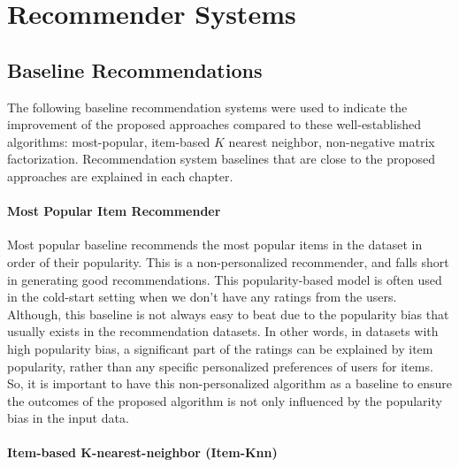     
\section{Recommender Systems}  


    \subsection{Baseline Recommendations}
    
        The following baseline recommendation systems were used to indicate the improvement of the proposed approaches compared to these well-established algorithms: most-popular, item-based $K$ nearest neighbor, non-negative matrix factorization. Recommendation system baselines that are close to the proposed approaches are explained in each chapter.
        
        \vspace{0.25cm}
        \noindent \paragraph{Most Popular Item Recommender}
        \vspace{0.25cm}
        
            Most popular baseline recommends the most popular items in the dataset in order of their popularity. This is a non-personalized recommender, and falls short in generating good recommendations. This popularity-based model is often used in the cold-start setting when we don't have any ratings from the users. Although, this baseline is not always easy to beat due to the popularity bias that usually exists in the recommendation datasets. In other words, in datasets with high popularity bias, a significant part of the ratings can be explained by item popularity, rather than any specific personalized preferences of users for items. So, it is important to have this non-personalized algorithm as a baseline to ensure the outcomes of the proposed algorithm is not only influenced by the popularity bias in the input data.
        
        \vspace{0.25cm}
        \noindent \paragraph{Item-based K-nearest-neighbor (Item-Knn)}
        \vspace{0.25cm}
        
